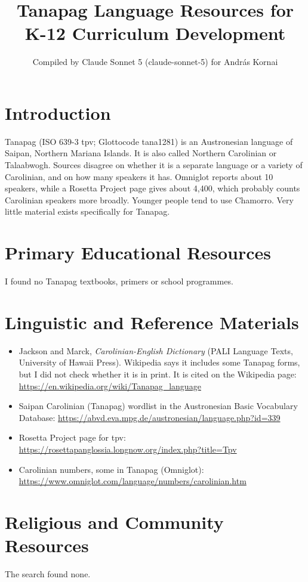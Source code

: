 \documentclass[12pt]{article}
\title{Tanapag Language Resources for K-12 Curriculum Development}
\author{Compiled by Claude Sonnet 5 (claude-sonnet-5) for Andr\'as Kornai}
\date{}
\begin{document}
\maketitle

\section{Introduction}
Tanapag (ISO 639-3 tpv; Glottocode tana1281) is an Austronesian language of Saipan, Northern Mariana Islands. It is also called Northern Carolinian or Talaabwogh. Sources disagree on whether it is a separate language or a variety of Carolinian, and on how many speakers it has. Omniglot reports about 10 speakers, while a Rosetta Project page gives about 4,400, which probably counts Carolinian speakers more broadly. Younger people tend to use Chamorro. Very little material exists specifically for Tanapag.

\section{Primary Educational Resources}
I found no Tanapag textbooks, primers or school programmes.

\section{Linguistic and Reference Materials}
\begin{itemize}
\item Jackson and Marck, \emph{Carolinian-English Dictionary} (PALI Language Texts, University of Hawaii Press). Wikipedia says it includes some Tanapag forms, but I did not check whether it is in print. It is cited on the Wikipedia page: \url{https://en.wikipedia.org/wiki/Tanapag_language}
\item Saipan Carolinian (Tanapag) wordlist in the Austronesian Basic Vocabulary Database: \url{https://abvd.eva.mpg.de/austronesian/language.php?id=339}
\item Rosetta Project page for tpv: \url{https://rosettapanglossia.longnow.org/index.php?title=Tpv}
\item Carolinian numbers, some in Tanapag (Omniglot): \url{https://www.omniglot.com/language/numbers/carolinian.htm}
\end{itemize}

\section{Religious and Community Resources}
The search found none.
\end{document}
